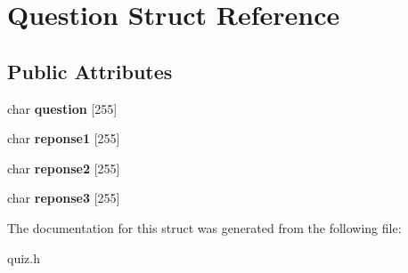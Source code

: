 \hypertarget{structQuestion}{}\section{Question Struct Reference}
\label{structQuestion}
\subsection*{Public Attributes}
\begin{DoxyCompactItemize}
\item 
\mbox{\label{structQuestion_aa8ca91163674475e19bffaf880bd0d84}} 
char {\bfseries question} \mbox{[}255\mbox{]}
\item 
\mbox{\label{structQuestion_aec5adc9c7b2e95f1101615b8a2b7e8e9}} 
char {\bfseries reponse1} \mbox{[}255\mbox{]}
\item 
\mbox{\label{structQuestion_a4853299f33b67d1c7b56294c827217ff}} 
char {\bfseries reponse2} \mbox{[}255\mbox{]}
\item 
\mbox{\label{structQuestion_a877f2cedcb1f1c54d630b5974500fb26}} 
char {\bfseries reponse3} \mbox{[}255\mbox{]}
\end{DoxyCompactItemize}


The documentation for this struct was generated from the following file\+:\begin{DoxyCompactItemize}
\item 
quiz.\+h\end{DoxyCompactItemize}
